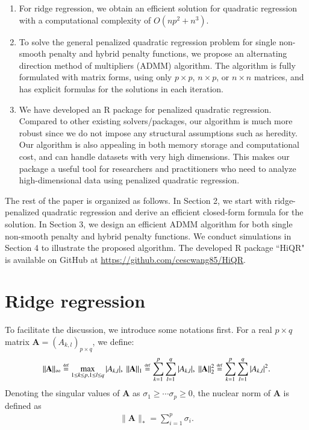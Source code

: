 \documentclass[preprint,authoryear,11pt]{elsarticle}
\newcommand{\A}{\mathbf A}
\def\defby{\stackrel{\mbox{\textrm{\tiny def}}}{=}}
\def\defby{\stackrel{\mbox{\textrm{\tiny def}}}{=}}
\begin{document}
\begin{enumerate}
\item For ridge regression, we obtain an efficient solution for quadratic regression with a computational complexity of $O(np^2+n^3)$.  
\item 
To solve the general penalized quadratic regression problem for single non-smooth penalty and hybrid penalty functions, we propose an alternating direction method of multipliers (ADMM) algorithm. The algorithm is fully formulated with matrix forms, using only $p \times p$, $n \times p$, or $n \times n$ matrices, and has explicit formulas for the solutions in each iteration. 

\item    
We have developed an R package for penalized quadratic regression. Compared to other existing solvers/packages, our algorithm is much more robust since we do not impose any structural assumptions such as heredity. Our algorithm is also appealing in both memory storage and computational cost, and can handle datasets with very high dimensions. This makes our package a useful tool for researchers and practitioners who need to analyze high-dimensional data using penalized quadratic regression.
\end{enumerate}
 
 
The rest of the paper is organized as follows. In Section 2, we start with ridge-penalized quadratic regression and derive an efficient closed-form formula for the solution. In Section 3, we design an efficient ADMM algorithm for both single non-smooth penalty and hybrid penalty functions. We conduct simulations in Section 4 to illustrate the proposed algorithm. The developed   R package ``HiQR" is available on GitHub at \url{https://github.com/cescwang85/HiQR}.



\section{Ridge regression}
 
To facilitate the discussion, we introduce some notations first. For a real $p \times q$ matrix $\A = (A_{k,l})_{p \times q}$, we define: 
\begin{align*}
 	\|\A\|_{\infty} \defby \max_{1\le k\le p,1\le l\le q}|A_{k,l}|,~  \|\A\|_{1} \defby\sum_{k=1}^p \sum_{l=1}^q|A_{k,l}|,~\|\A\|^2_{2} \defby\sum_{k=1}^p \sum_{l=1}^q|A_{k,l}|^2.
 \end{align*}
Denoting the singular values of $\A$ as $\sigma_1 \geq \cdots \sigma_p \geq 0$, the nuclear norm of $\A$ is defined as
\begin{align*}
	\|\A\|_*=\sum_{i=1}^p \sigma_i.
\end{align*}
\end{document}

